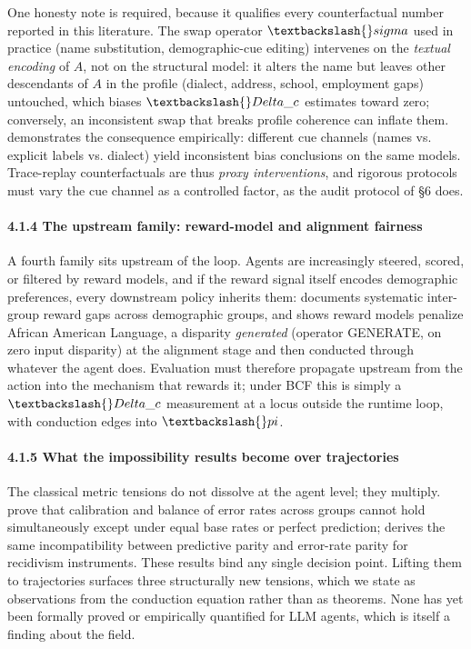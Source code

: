 \documentclass[10pt]{article}
\begin{document}
One honesty note is required, because it qualifies every counterfactual number reported in this literature. The swap operator $\textbackslash\{\}sigma$ used in practice (name substitution, demographic-cue editing) intervenes on the \emph{textual encoding} of $A$, not on the structural model: it alters the name but leaves other descendants of $A$ in the profile (dialect, address, school, employment gaps) untouched, which biases $\textbackslash\{\}Delta\_c$ estimates toward zero; conversely, an inconsistent swap that breaks profile coherence can inflate them. \cite{tonneau2026different} demonstrates the consequence empirically: different cue channels (names vs. explicit labels vs. dialect) yield inconsistent bias conclusions on the same models. Trace-replay counterfactuals are thus \emph{proxy interventions}, and rigorous protocols must vary the cue channel as a controlled factor, as the audit protocol of \S{}6 does.

\paragraph*{4.1.4 The upstream family: reward-model and alignment fairness}

A fourth family sits upstream of the loop. Agents are increasingly steered, scored, or filtered by reward models, and if the reward signal itself encodes demographic preferences, every downstream policy inherits them: \cite{song2025large} documents systematic inter-group reward gaps across demographic groups, and \cite{mire2025rejected} shows reward models penalize African American Language, a disparity \emph{generated} (operator GENERATE, on zero input disparity) at the alignment stage and then conducted through whatever the agent does. Evaluation must therefore propagate upstream from the action into the mechanism that rewards it; under BCF this is simply a $\textbackslash\{\}Delta\_c$ measurement at a locus outside the runtime loop, with conduction edges into $\textbackslash\{\}pi$.

\paragraph*{4.1.5 What the impossibility results become over trajectories}

The classical metric tensions do not dissolve at the agent level; they multiply. \cite{kleinberg2017inherent} prove that calibration and balance of error rates across groups cannot hold simultaneously except under equal base rates or perfect prediction; \cite{chouldechova2017fair} derives the same incompatibility between predictive parity and error-rate parity for recidivism instruments. These results bind any single decision point. Lifting them to trajectories surfaces three structurally new tensions, which we state as observations from the conduction equation rather than as theorems. None has yet been formally proved or empirically quantified for LLM agents, which is itself a finding about the field.
\end{document}

